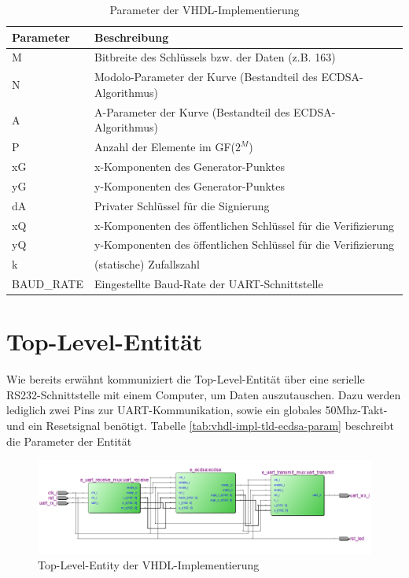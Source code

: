 \begin{table} [h]
	\centering 
	\begin{tabular}{ | p{3cm} | p{12cm} | }
		\hline
		\textbf{Parameter} & \textbf{Beschreibung}\\
		\hline
		M & Bitbreite des Schlüssels bzw. der Daten (z.B. 163) \\
		\hline
		N & Modolo-Parameter der Kurve (Bestandteil des ECDSA-Algorithmus) \\
		\hline
		A & A-Parameter der Kurve (Bestandteil des ECDSA-Algorithmus) \\
		\hline
		P & Anzahl der Elemente im GF($2^M$) \\
		\hline
		xG & x-Komponenten des Generator-Punktes \\
		\hline
		yG & y-Komponenten des Generator-Punktes \\
		\hline
		dA & Privater Schlüssel für die Signierung \\
		\hline
		xQ & x-Komponenten des öffentlichen Schlüssel für die Verifizierung \\
		\hline
		yQ & y-Komponenten des öffentlichen Schlüssel für die Verifizierung \\
		\hline
		k & (statische) Zufallszahl \\
		\hline
		BAUD\_RATE & Eingestellte Baud-Rate der UART-Schnittstelle \\
		\hline
	\end{tabular}
	\caption{Parameter der VHDL-Implementierung}
	\label{tab:vhdl-impl-param}
\end{table}



\section{Top-Level-Entität}
\label{vhdl-impl-tld}

Wie bereits erwähnt kommuniziert die Top-Level-Entität über eine serielle RS232-Schnittstelle mit einem Computer, um Daten auszutauschen. Dazu werden lediglich zwei Pins zur UART-Kommunikation, sowie ein globales 50Mhz-Takt- und ein Resetsignal benötigt. Tabelle \ref{tab:vhdl-impl-tld-ecdsa-param} beschreibt die Parameter der Entität \\

\begin{figure}[thb]
	\centering
	\includegraphics[width=\textwidth]{bilder/tle}
	\caption{Top-Level-Entity der VHDL-Implementierung}
	\label{fig:vhdl-impl-tle}
\end{figure}

